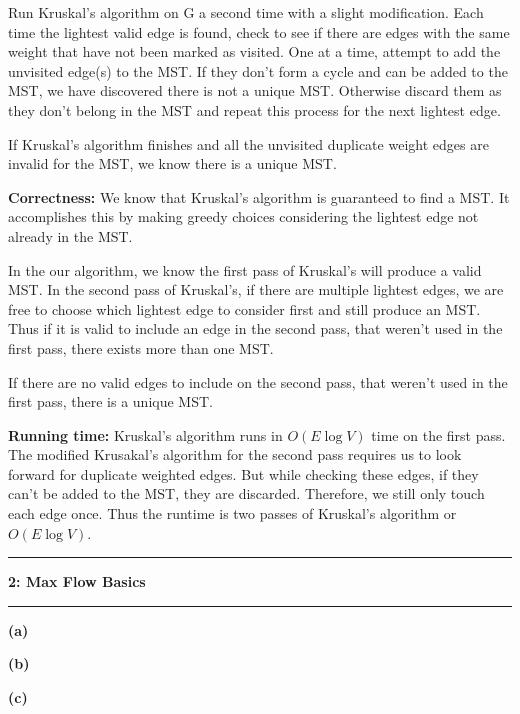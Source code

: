 \documentclass[11pt]{article}
\newcommand\question[2]{\vspace{.25in}\hrule\textbf{#1: #2}\vspace{.5em}\hrule\vspace{.10in}}
\renewcommand\part[1]{\vspace{.10in}\textbf{(#1)}}
\newcommand\correctness{\vspace{.10in}\textbf{Correctness: }}
\newcommand\runtime{\vspace{.10in}\textbf{Running time: }}
\begin{document}
Run Kruskal's algorithm on G a second time with a slight modification. Each time the lightest valid edge is found, check to see if there are edges with the same weight that have not been marked as visited. One at a time, attempt to add the unvisited edge(s) to the MST. If they don't form a cycle and can be added to the MST, we have discovered there is not a unique MST. Otherwise discard them as they don't belong in the MST and repeat this process for the next lightest edge.

 	If Kruskal's algorithm finishes and all the unvisited duplicate weight edges are invalid for the MST, we know there is a unique MST.

\correctness We know that Kruskal's algorithm is guaranteed to find a MST. It accomplishes this by making greedy choices considering the lightest edge not already in the MST.

	In the our algorithm, we know the first pass of Kruskal's will produce a valid MST. In the second pass of Kruskal's, if there are multiple lightest edges, we are free to choose which lightest edge to consider first and still produce an MST. Thus if it is valid to include an edge in the second pass, that weren't used in the first pass, there exists more than one MST.
	
	If there are no valid edges to include on the second pass, that weren't used in the first pass, there is a unique MST.

\runtime Kruskal's algorithm runs in $O(E \log V)$ time on the first pass. The modified Krusakal's algorithm for the second pass requires us to look forward for duplicate weighted edges. But while checking these edges, if they can't be added to the MST, they are discarded. Therefore, we still only touch each edge once. Thus the runtime is two passes of Kruskal's algorithm or $O(E \log V)$.


\question{2}{Max Flow Basics}

\part{a} 

\part{b}

\part{c}
\end{document}
